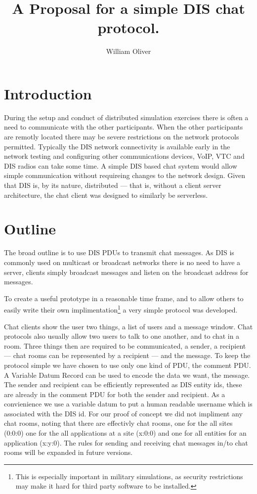 \documentclass[12pt]{article}
\begin{document}
%
% 
\doublespacing
%
%
\author{William Oliver}
\title{A Proposal for a simple DIS chat protocol.}
\maketitle
\tableofcontents
%
%
\section{Introduction}
\label{sec:intro}
During the setup and conduct of distributed simulation exercises there
is often a need to communicate with the other participants. When the
other participants are remotly located there may be severe
restrictions on the network protocols permitted. Typically the DIS
network connectivity is available early in the network testing and
configuring other communications devices, VoIP, VTC and DIS radios can
take some time.  A simple DIS based chat system would allow simple
communication without requireing changes to the network design. Given
that DIS is, by its nature, distributed --- that is, without a client
server architecture, the chat client was designed to similarly be
serverless.

\section{Outline}
\label{sec:outline}

The broad outline is to use DIS PDUs to transmit chat messages. As DIS
is commonly used on multicast or broadcast networks there is no need
to have a server, clients simply broadcast messages and listen on the
broadcast address for messages.

To create a useful prototype in a reasonable time frame, and to allow
others to easily write their own implimentation\footnote{This is
  especially important in military simulations, as security
  restrictions may make it hard for third party software to be
  installed.} a very simple protocol was developed.

Chat clients show the user two things, a list of users and a message
window. Chat protocols also usually allow two users to talk to one
another, and to chat in a room. Three things then are required to be
communicated, a sender, a recipient --- chat rooms can be represented
by a recipient --- and the message. To keep the protocol simple we
have chosen to use only one kind of PDU, the comment PDU. A Variable
Datum Record can be used to encode the data we want, the message. The
sender and recipient can be efficiently represented as DIS entity ids,
these are already in the comment PDU for both the sender and
recipient. As a convienience we use a variable datum to put a human
readable username which is associated with the DIS id. For our proof
of concept we did not impliment any chat rooms, noting that there are
effectivly chat rooms, one for the all sites (0:0:0) one for the all
applications at a site (x:0:0) and one for all entities for an
application (x:y:0). The rules for sending and receiving chat messages
in/to chat rooms will be expanded in future versions.
\end{document}
